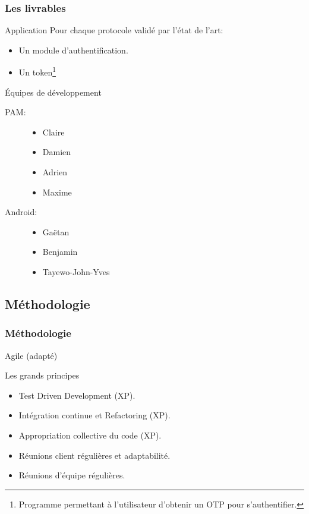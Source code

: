 \documentclass[xcolor=table]{beamer}
\begin{document}
\begin{frame}
\frametitle{Les livrables}
\begin{block}{Application}
    Pour chaque protocole validé par l'état de l'art:
  \begin{itemize}
    \item Un module d'authentification.
    \item Un token\footnote[1]{Programme permettant à l'utilisateur d'obtenir un 
      OTP pour s'authentifier.}
  \end{itemize}
\end{block}
\begin{block}{Équipes de développement}
\begin{center}

  \begin{description}
    \item[PAM:]
    \begin{itemize}
      \item Claire 
      \item Damien 
      \item Adrien 
      \item Maxime 
    \end{itemize}
    \item[Android:]
    \begin{itemize}
      \item Gaëtan 
      \item Benjamin 
      \item Tayewo-John-Yves 
    \end{itemize}
  \end{description}
 
\end{center}
\end{block}
\end{frame}

\subsection{Méthodologie}


\begin{frame}
\frametitle{Méthodologie}
\begin{center}
\Huge Agile (adapté)
\normalsize
\begin{block}{Les grands principes}
\begin{itemize}
 \item Test Driven Development (XP).
 \item Intégration continue et Refactoring (XP).
 \item Appropriation collective du code (XP).
 \item Réunions client régulières et adaptabilité.
 \item Réunions d'équipe régulières.
\end{itemize}
\end{block}
\end{center}

\end{frame}
\end{document}
